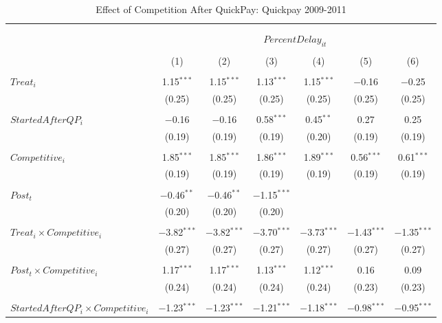 \documentclass[
]{article}
\begin{document}
\begin{table}[H] \centering 
  \caption{Effect of Competition After QuickPay: Quickpay 2009-2011} 
  \label{} 
\small 
\begin{tabular}{@{\extracolsep{-3pt}}lcccccc} 
\\[-1.8ex]\hline 
\hline \\[-1.8ex] 
\\[-1.8ex] & \multicolumn{6}{c}{$PercentDelay_{it}$  } \\ 
\\[-1.8ex] & (1) & (2) & (3) & (4) & (5) & (6)\\ 
\hline \\[-1.8ex] 
 $Treat_i$ & 1.15$^{***}$ & 1.15$^{***}$ & 1.13$^{***}$ & 1.15$^{***}$ & $-$0.16 & $-$0.25 \\ 
  & (0.25) & (0.25) & (0.25) & (0.25) & (0.25) & (0.25) \\ 
  & & & & & & \\ 
 $StartedAfterQP_i$ & $-$0.16 & $-$0.16 & 0.58$^{***}$ & 0.45$^{**}$ & 0.27 & 0.25 \\ 
  & (0.19) & (0.19) & (0.19) & (0.20) & (0.19) & (0.19) \\ 
  & & & & & & \\ 
 $Competitive_i$ & 1.85$^{***}$ & 1.85$^{***}$ & 1.86$^{***}$ & 1.89$^{***}$ & 0.56$^{***}$ & 0.61$^{***}$ \\ 
  & (0.19) & (0.19) & (0.19) & (0.19) & (0.19) & (0.19) \\ 
  & & & & & & \\ 
 $Post_t$ & $-$0.46$^{**}$ & $-$0.46$^{**}$ & $-$1.15$^{***}$ &  &  &  \\ 
  & (0.20) & (0.20) & (0.20) &  &  &  \\ 
  & & & & & & \\ 
 $Treat_i \times Competitive_i$ & $-$3.82$^{***}$ & $-$3.82$^{***}$ & $-$3.70$^{***}$ & $-$3.73$^{***}$ & $-$1.43$^{***}$ & $-$1.35$^{***}$ \\ 
  & (0.27) & (0.27) & (0.27) & (0.27) & (0.27) & (0.27) \\ 
  & & & & & & \\ 
 $Post_t \times Competitive_i$ & 1.17$^{***}$ & 1.17$^{***}$ & 1.13$^{***}$ & 1.12$^{***}$ & 0.16 & 0.09 \\ 
  & (0.24) & (0.24) & (0.24) & (0.24) & (0.23) & (0.23) \\ 
  & & & & & & \\ 
 $StartedAfterQP_i \times Competitive_i$ & $-$1.23$^{***}$ & $-$1.23$^{***}$ & $-$1.21$^{***}$ & $-$1.18$^{***}$ & $-$0.98$^{***}$ & $-$0.95$^{***}$ \\ 

\end{tabular}
\end{table}
\end{document}
